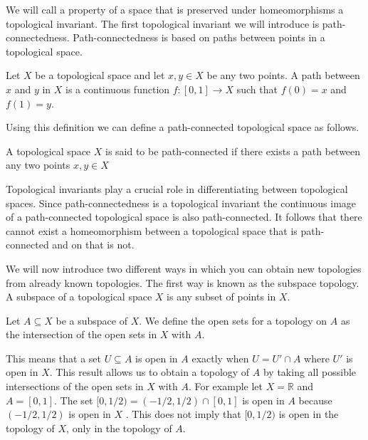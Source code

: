 We will call a property of a space that is preserved under homeomorphisms a topological invariant. The first topological invariant we will introduce is path-connectedness. Path-connectedness is based on paths between points in a topological space.

\begin{defn} Let $X$ be a topological space and let $x, y \in X$ be any two points. A path between $x$ and $y$ in $X$ is a continuous function $f: [0, 1] \to X$ such that $f(0) = x$ and $f(1) = y$.  \end{defn}

Using this definition we can define a path-connected topological space as follows.

\begin{defn} A topological space $X$ is said to be path-connected if there exists a path between any two points $x, y \in X$  \end{defn}


Topological invariants play a crucial role in differentiating between topological spaces. Since path-connectedness is a topological invariant the continuous image of a path-connected topological space is also path-connected.  It follows that there cannot exist a homeomorphism between a topological space that is path-connected and on that is not.

We will now introduce two different ways in which you can obtain new topologies from already known topologies. The first way is known as the subspace topology. A subspace of a topological space $X$ is any subset of points in $X$.

\begin{defn} Let $A \subseteq X$ be a subspace of $X$. We define the open sets for a topology on $A$ as the intersection of the open sets in $X$ with $A$. \end{defn}

This means that a set $U \subseteq A$ is open in $A$ exactly when $U = U' \cap A$ where $U'$ is open in $X$. This result allows us to obtain a topology of $A$ by taking all possible intersections of the open sets in $X$ with $A$. For example let $X = \mathbb{R}$ and $A = [0, 1]$. The set $[0, 1/2) = (-1/2, 1/2) \cap [0, 1]$ is open in $A$ because $(-1/2, 1/2)$ is open in $X$
. This does not imply that $[0, 1/2)$ is open in the topology of $X$, only in the topology of $A$.

